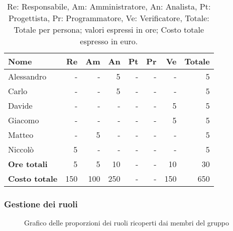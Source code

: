 \begin{table}[H]
	\centering
	\begin{tabular}{l|r|r|r|r|r|r|r}
	\textbf{Nome} & \textbf{Re} & \textbf{Am} & \textbf{An} & \textbf{Pt} & \textbf{Pr} & \textbf{Ve} & \textbf{Totale} \\
	\hline
	Alessandro & - & - & 5 & - & - & - & 5 \\
	Carlo & - & - & 5 & - & - & - & 5 \\
	Davide & - & - & - & - & - & 5 & 5 \\
	Giacomo & - & - & - & - & - & 5 & 5 \\
	Matteo & - & 5 & - & - & - & - & 5 \\
	Niccolò & 5 & - & - & - & - & - & 5 \\
	\hline
	\textbf{Ore totali} & 5 & 5 & 10 & - & - & 10 & 30 \\
	\textbf{Costo totale} & 150 & 100 & 250 & - & - & 150 & 650
	\end{tabular}
	\caption{Re: Responsabile, Am: Amministratore, An: Analista, Pt: Progettista,
		Pr: Programmatore, Ve: Verificatore, Totale: Totale per persona; valori espressi in ore; Costo totale espresso in euro.} 
\end{table}

\subsubsection{Gestione dei ruoli}

\begin{figure}[h]
	\centering
    \caption{Grafico delle proporzioni dei ruoli ricoperti dai membri del gruppo}
\end{figure}
